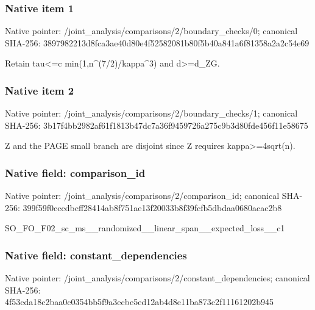 \documentclass[10pt,a4paper]{article}
\begin{document}
\subsubsection{Native item 1}
Native pointer: /joint\_\allowbreak{}analysis/comparisons/2/boundary\_\allowbreak{}checks/0; canonical SHA-256: 3897982213d8fca3ae40d80e4f52582081b80f5b40a841a6f81358a2a2c54e69

\begingroup\raggedright\sloppy Retain tau<=\allowbreak{}c min(1,\allowbreak{}n\textasciicircum{}(7/\allowbreak{}2)/\allowbreak{}kappa\textasciicircum{}3) and d>=\allowbreak{}d\_\allowbreak{}ZG.\par\endgroup

\subsubsection{Native item 2}
Native pointer: /joint\_\allowbreak{}analysis/comparisons/2/boundary\_\allowbreak{}checks/1; canonical SHA-256: 3b17f4bb2982af61f1813b47dc7a36f9459726a275c9b3d80fde456f11e58675

\begingroup\raggedright\sloppy Z and the PAGE small branch are disjoint since Z requires kappa>=\allowbreak{}4sqrt(n).\par\endgroup

\subsubsection{Native field: comparison\_\allowbreak{}id}
Native pointer: /joint\_\allowbreak{}analysis/comparisons/2/comparison\_\allowbreak{}id; canonical SHA-256: 399f59f0cccdbcff28414ab8f751ae13f20033b8f39fcfb5dbdaa0680acac2b8

\begingroup\raggedright\sloppy SO\_\allowbreak{}FO\_\allowbreak{}F02\_\allowbreak{}sc\_\allowbreak{}ms\_\allowbreak{}\_\allowbreak{}randomized\_\allowbreak{}\_\allowbreak{}linear\_\allowbreak{}span\_\allowbreak{}\_\allowbreak{}expected\_\allowbreak{}loss\_\allowbreak{}\_\allowbreak{}c1\par\endgroup

\subsubsection{Native field: constant\_\allowbreak{}dependencies}
Native pointer: /joint\_\allowbreak{}analysis/comparisons/2/constant\_\allowbreak{}dependencies; canonical SHA-256: 4f53cda18c2baa0c0354bb5f9a3ecbe5ed12ab4d8e11ba873c2f11161202b945
\end{document}
